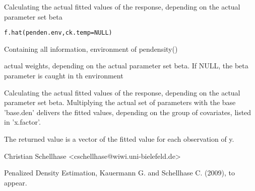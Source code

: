 \begin{Description}\relax
Calculating the actual fitted values of the response, depending on the actual parameter set beta
\end{Description}
\begin{Usage}
\begin{verbatim}
f.hat(penden.env,ck.temp=NULL)
\end{verbatim}
\end{Usage}
\begin{Arguments}
\begin{ldescription}
\item[\code{penden.env}] Containing all information, environment of pendensity()
\item[\code{ck.temp}] actual weights, depending on the actual parameter set beta. If NULL, the beta parameter is caught in th environment
\end{ldescription}
\end{Arguments}
\begin{Details}\relax
Calculating the actual fitted values of the response, depending on the actual parameter set beta. Multiplying the actual set of parameters  with the base 'base.den' delivers the fitted values, depending on the group of covariates, listed in 'x.factor'.
\end{Details}
\begin{Value}
The returned value is a vector of the fitted value for each observation of y.
\end{Value}
\begin{Author}\relax
Christian Schellhase <cschellhase@wiwi.uni-bielefeld.de>
\end{Author}
\begin{References}\relax
Penalized Density Estimation, Kauermann G. and Schellhase C. (2009), to appear.
\end{References}

